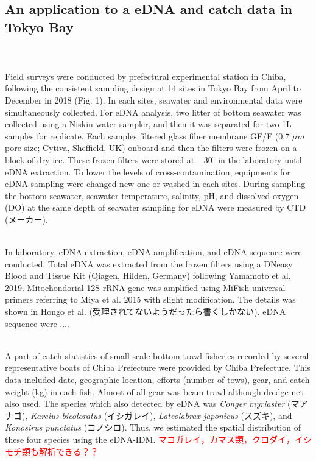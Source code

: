 \documentclass[12pt]{article}
\begin{document}
\begin{linenumbers}
\subsection{An application to a eDNA and catch data in Tokyo Bay}
\\
\\
Field surveys were conducted by prefectural experimental station in Chiba, following the consistent sampling design at 14 sites in Tokyo Bay from April to December in 2018 (Fig. 1). 
In each sites, seawater and environmental data were simultaneously collected. For eDNA analysis, two litter of bottom seawater was collected using a Niskin water sampler, and then it was separated for two 1L samples for replicate. Each samples filtered glass fiber membrane GF/F (0.7 $\mu m$ pore size; Cytiva, Sheffield, UK) onboard and then the filters were frozen on a block of dry ice. These frozen filters were stored at $-30^\circ$ in the laboratory until eDNA extraction. To lower the levels of cross-contamination, equipments for eDNA sampling were changed new one or washed in each sites. During sampling the bottom seawater, seawater temperature, salinity, pH, and dissolved oxygen (DO) at the same depth of seawater sampling for eDNA were measured by CTD (メーカー).

\\
In laboratory, eDNA extraction, eDNA amplification, and eDNA sequence were conducted. Total eDNA was extracted from the frozen filters using a DNeasy Blood and Tissue Kit (Qiagen, Hilden, Germany) following Yamamoto et al. 2019. Mitochondorial 12S rRNA gene was amplified using MiFish universal primers referring to Miya et al. 2015 with slight modification. The details was shown in Hongo et al. (受理されてないようだったら書くしかない).  eDNA sequence were ....


\\
A part of catch statistics of small-scale bottom trawl fisheries recorded by several representative boats of Chiba Prefecture were provided by Chiba Prefecture. This data included date, geographic location, efforts (number of tows), gear, and catch weight (kg) in each fish. Almost of all gear was beam trawl although dredge net also used. The species which also detected by eDNA was \textit{Conger myriaster} (マアナゴ), \textit{Kareius bicoloratus} (イシガレイ), \textit{Lateolabrax japonicus} (スズキ), and \textit{Konosirus punctatus} (コノシロ). Thus, we estimated the spatial distribution of these four species using the eDNA-IDM. \textcolor{red}{マコガレイ，カマス類，クロダイ，イシモチ類も解析できる？？}


\end{linenumbers}
\end{document}
